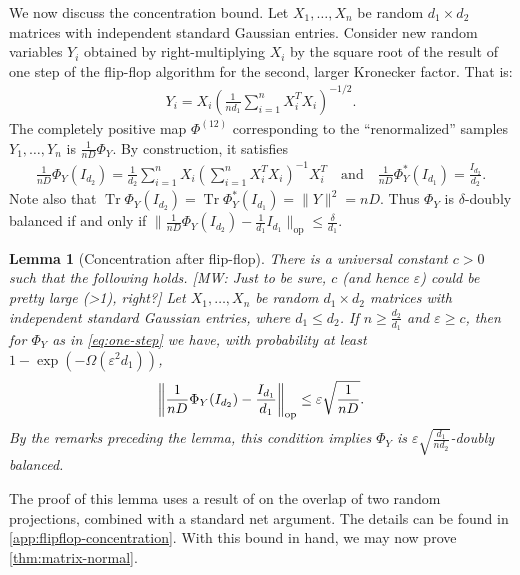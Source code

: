 \documentclass[aos]{imsart}
\newtheorem{lemma}[theorem]{Lemma}
\theoremstyle{definition}
\numberwithin{equation}{section}
\DeclareMathOperator{\op}{op}
\DeclareMathOperator{\tr}{Tr}
\DeclarePairedDelimiter{\norm}{\lVert}{\rVert}
\newcommand{\eps}{\varepsilon}
\newcommand{\MW}[1]{{\color{red}[MW: #1]}}
\newcommand{\MW}[1]{{}}
\begin{document}
We now discuss the concentration bound.
Let $X_1,\dots,X_n$ be random $d_1 \times d_2$ matrices with independent standard Gaussian entries.
Consider new random variables $Y_i$ obtained by right-multiplying $X_i$ by the square root of the result of one step of the flip-flop algorithm for the second, larger Kronecker factor.
That is:
\begin{align}\label{eq:one-step}
  Y_i = X_i \left( \frac1{nd_1} \sum_{i=1}^n X_i^T X_i \right)^{-1/2}.
\end{align}
The completely positive map $\Phi^{(12)}$ corresponding to the ``renormalized'' samples $Y_1,\dots,Y_n$ is $\frac1{nD} \Phi_Y$.
By construction, it satisfies
\begin{align*}
  \frac1{n D} \Phi_Y(I_{d_2}) = \frac1{d_2} \sum_{i=1}^{n} X_i \left( \sum_{i=1}^n X_i^T X_i \right)^{-1} X_i^T
\quad\text{and}\quad
  \frac1{n D} \Phi^*_Y(I_{d_1}) = \frac{I_{d_2}}{d_2}.
\end{align*}
Note also that $\tr \Phi_Y(I_{d_2}) = \tr \Phi_Y^*(I_{d_1}) = \|Y\|^2 = nD$. Thus $\Phi_Y$ is $\delta$-doubly balanced if and only if $\|\frac{1}{nD} \Phi_Y(I_{d_2}) - \frac{1}{d_1} I_{d_1}\|_{\op} \leq \frac{\delta}{d_1}$.

\begin{lemma}[Concentration after flip-flop]\label{lem:flipflop-concentration}
There is a universal constant $c>0$ such that the following holds.
\MW{Just to be sure, $c$ (and hence $\eps$) could be pretty large (>1), right?}
Let $X_1,\dots,X_n$ be random $d_1 \times d_2$ matrices with independent standard Gaussian entries, where $d_1 \leq d_2$.
If $n \geq \frac{d_2}{d_1}$ and $\eps\geq c$, then for $\Phi_Y$ as in \cref{eq:one-step} we have, with probability at least $1 - \exp(- \Omega( \eps^2 d_{1}))$,
\begin{align*}
  \norm*{\frac1{n D} \Phi_Y(I_{d_2}) - \frac{I_{d_1}}{d_1}}_{\op} \leq \eps \sqrt{\frac1{nD}}.
\end{align*}
By the remarks preceding the lemma, this condition implies $\Phi_Y$ is $\eps \sqrt{\frac{d_1}{nd_2}}$-doubly balanced.
\end{lemma}

The proof of this lemma uses a result of \cite{hayden2006aspects} on the overlap of two random projections, combined with a standard net argument.
The details can be found in \cref{app:flipflop-concentration}.
With this bound in hand, we may now prove \cref{thm:matrix-normal}.
\end{document}
